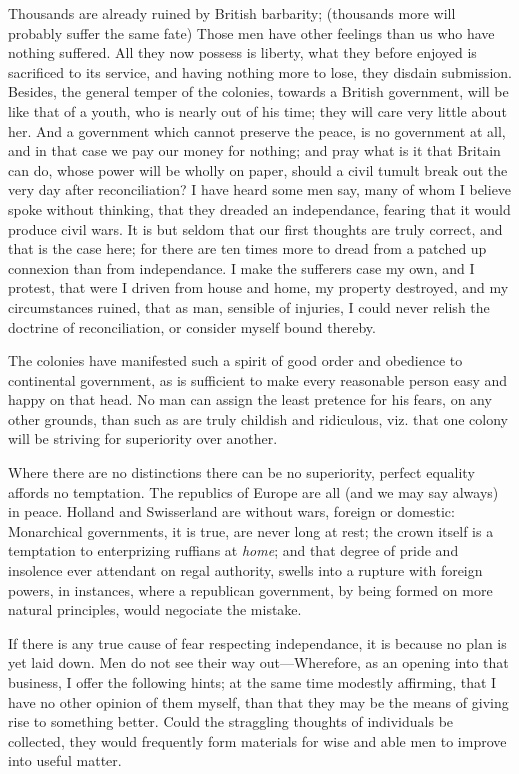 \documentclass[12pt, twocolumn]{book}
\begin{document}
    Thousands are already ruined by British barbarity; (thousands more will probably suffer the same fate) Those men have other feelings than us who have nothing suffered. All they now possess is liberty, what they before enjoyed is sacrificed to its service, and having nothing more to lose, they disdain submission. Besides, the general temper of the colonies, towards a British government, will be like that of a youth, who is nearly out of his time; they will care very little about her. And a government which cannot preserve the peace, is no government at all, and in that case we pay our money for nothing; and pray what is it that Britain can do, whose power will be wholly on paper, should a civil tumult break out the very day after reconciliation? I have heard some men say, many of whom I believe spoke without thinking, that they dreaded an independance, fearing that it would produce civil wars. It is but seldom that our first thoughts are truly correct, and that is the case here; for there are ten times more to dread from a patched up connexion than from independance. I make the sufferers case my own, and I protest, that were I driven from house and home, my property destroyed, and my circumstances ruined, that as man, sensible of injuries, I could never relish the doctrine of reconciliation, or consider myself bound thereby.

    The colonies have manifested such a spirit of good order and obedience to continental government, as is sufficient to make every reasonable person easy and happy on that head. No man can assign the least pretence for his fears, on any other grounds, than such as are truly childish and ridiculous, viz. that one colony will be striving for superiority over another.

    Where there are no distinctions there can be no superiority, perfect equality affords no temptation. The republics of Europe are all (and we may say always) in peace. Holland and Swisserland are without wars, foreign or domestic: Monarchical governments, it is true, are never long at rest; the crown itself is a temptation to enterprizing ruffians at \textit{home}; and that degree of pride and insolence ever attendant on regal authority, swells into a rupture with foreign powers, in instances, where a republican government, by being formed on more natural principles, would negociate the mistake.

    If there is any true cause of fear respecting independance, it is because no plan is yet laid down. Men do not see their way out—Wherefore, as an opening into that business, I offer the following hints; at the same time modestly affirming, that I have no other opinion of them myself, than that they may be the means of giving rise to something better. Could the straggling thoughts of individuals be collected, they would frequently form materials for wise and able men to improve into useful matter.
\end{document}
